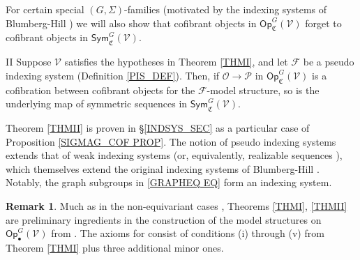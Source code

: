 \documentclass[a4paper,10pt
,draft
]{article}%
\numberwithin{equation}{section}
\numberwithin{figure}{section}
\theoremstyle{definition} %
\newtheorem{remark}[equation]{Remark}%
\newcommand{\Sym}{\ensuremath{\mathsf{Sym}}}%
\newcommand{\Op}{\mathsf{Op}}%
\newcommand{\F}{\ensuremath{\mathcal F}}
\newcommand{\V}{\ensuremath{\mathcal V}}
\renewcommand{\O}{\ensuremath{\mathcal O}}
\newcommand{\1}{\ensuremath{\mathbbm 1}}%
\begin{document}
For certain special $(G,\Sigma)$-families
(motivated by the indexing systems of Blumberg-Hill \cite{BH15})
we will also show that cofibrant objects in 
$\Op^G_{\mathfrak C}(\V)$
forget to cofibrant objects in 
$\mathsf{Sym}^G_{\mathfrak C}(\V)$.


\begin{customthm}{II}\label{THMII}
	Suppose $\V$ satisfies the hypotheses in Theorem \ref{THMI},
	and let $\F$ be a pseudo indexing system (Definition \ref{PIS_DEF}).
	Then, if $\O \to \mathcal{P}$ in $\Op^G_{\mathfrak{C}}(\V)$ is a cofibration between cofibrant objects for the $\F$-model structure,
	so is the underlying
	map of symmetric sequences in $\Sym^G_{\mathfrak{C}}(\V)$.
\end{customthm}


Theorem \ref{THMII} is proven in \S \ref{INDSYS_SEC}
as a particular case of Proposition \ref{SIGMAG_COF PROP}.
The notion of pseudo indexing systems
extends that of weak indexing systems \cite[Def. 4.49]{BP_geo}
(or, equivalently, realizable sequences \cite[Def. 4.6]{GW18}),
which themselves extend the original 
indexing systems of Blumberg-Hill \cite{BH15}.
Notably, the graph subgroups in \eqref{GRAPHEQ EQ} form an indexing system.


\begin{remark}
        Much as in the non-equivariant cases \cite{CM13b,Cav},
        Theorems \ref{THMI}, \ref{THMII} are preliminary ingredients
        in the construction of the model structures on $\Op_\bullet^G(\V)$ from \cite[Thm. \ref{AC-THMA}]{BP_ACOP}.
        The axioms for \cite[Thm. \ref{AC-THMA}]{BP_ACOP} consist of conditions (i) through (v) from Theorem \ref{THMI} plus three additional minor ones.
\end{remark}
\end{document}
